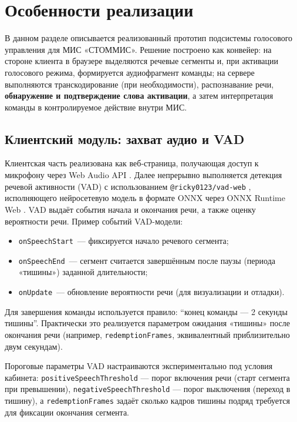 
\clearpage
\section{Особенности реализации}
\label{sec:solution}

В данном разделе описывается реализованный прототип подсистемы голосового управления для МИС «СТОММИС».
Решение построено как конвейер: на стороне клиента в браузере выделяются речевые сегменты и, при активации голосового режима, формируется аудиофрагмент команды; на сервере выполняются транскодирование (при необходимости), распознавание речи, \textbf{обнаружение и подтверждение слова активации}, а затем интерпретация команды в контролируемое действие внутри МИС.

\subsection{Клиентский модуль: захват аудио и VAD}
\label{subsec:task1}

Клиентская часть реализована как веб‑страница, получающая доступ к микрофону через Web Audio API \cite{WebAudio}.
Далее непрерывно выполняется детекция речевой активности (VAD) с использованием \texttt{@ricky0123/vad-web} \cite{RickyVADWeb}, исполняющего нейросетевую модель в формате ONNX через ONNX Runtime Web \cite{ONNXRuntimeWeb}.
VAD выдаёт события начала и окончания речи, а также оценку вероятности речи.
Пример событий VAD-модели:
\begin{itemize}
    \item \texttt{onSpeechStart}~--- фиксируется начало речевого сегмента;
    \item \texttt{onSpeechEnd}~--- сегмент считается завершённым после паузы (периода «тишины») заданной длительности;
    \item \texttt{onUpdate}~--- обновление вероятности речи (для визуализации и отладки).
\end{itemize}

Для завершения команды используется правило: \enquote{конец команды --- 2 секунды тишины}.
Практически это реализуется параметром ожидания «тишины» после окончания речи (например, \texttt{redemptionFrames}, эквивалентный приблизительно двум секундам).

Пороговые параметры VAD настраиваются экспериментально под условия кабинета:
\texttt{positiveSpeechThreshold} — порог включения речи (старт сегмента при превышении),
\texttt{negativeSpeechThreshold} — порог выключения (переход в тишину),
а \texttt{redemptionFrames} задаёт сколько кадров тишины подряд требуется для фиксации окончания сегмента.

